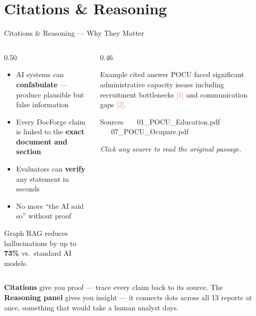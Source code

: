 \documentclass[aspectratio=169,11pt]{beamer}
\begin{document}
\section{Citations \& Reasoning}

\begin{frame}{Citations \& Reasoning — Why They Matter}
  \vspace{0.2cm}
  \begin{columns}[t]
    \begin{column}{0.50\textwidth}
      \begin{itemize}\setlength\itemsep{10pt}
        \item AI systems can \textbf{confabulate} — produce
              plausible but false information
        \item Every DocForge claim is linked to the
              \textbf{exact document and section}
        \item Evaluators can \textbf{verify} any statement
              in seconds
        \item No more ``the AI said so'' without proof
      \end{itemize}
      \vspace{0.6em}
      \colorbox{lightcoral!60}{%
        \parbox{0.9\linewidth}{\scriptsize\centering
          Graph RAG reduces hallucinations by up to
          \textbf{73\%} vs.\ standard AI models.
        }%
      }
    \end{column}
    \begin{column}{0.46\textwidth}
      \begin{block}{Example cited answer}
        \small
        POCU faced significant administrative
        capacity issues including recruitment
        bottlenecks \textcolor{coral}{[1]}
        and communication gaps \textcolor{coral}{[2]}.
      \end{block}
      \vspace{0.5em}
      \begin{alertblock}{Sources}
        \small
        \textcolor{white}{[1]}\ 01\_POCU\_Education.pdf\\[2pt]
        \textcolor{white}{[2]}\ 07\_POCU\_Ocupare.pdf
      \end{alertblock}
      \vspace{0.4em}
      {\scriptsize\itshape\textcolor{midgray}{%
        Click any source to read the original passage.}}
    \end{column}
  \end{columns}
  \vspace{0.5em}
  \begin{center}
    \colorbox{lightcoral!60}{%
      \parbox{0.88\textwidth}{\centering\small
        \textbf{Citations} give you proof — trace every claim back to its source.
        The \textbf{Reasoning panel} gives you insight — it connects dots across
        all 13 reports at once, something that would take a human analyst days.
      }%
    }
  \end{center}
\end{frame}
\end{document}
